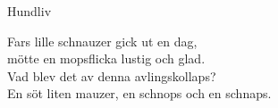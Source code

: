 \begin{song}{Hundliv}
	
	
	
	
	Fars lille schnauzer gick ut en dag,\\
	mötte en mopsflicka lustig och glad.\\
	Vad blev det av denna avlingskollaps?\\
	En söt liten mauzer, en schnops och en schnaps.

	
\end{song}
